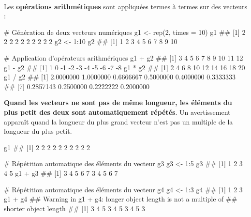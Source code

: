\documentclass[12pt,twosided, notitlepage]{book}
\newenvironment{Shaded}{}{}
\newcommand{\CommentTok}[1]{\textcolor[rgb]{0.00,0.50,0.00}{#1}}
\newcommand{\DataTypeTok}[1]{#1}
\newcommand{\DecValTok}[1]{#1}
\newcommand{\KeywordTok}[1]{\textcolor[rgb]{0.00,0.00,1.00}{#1}}
\newcommand{\NormalTok}[1]{#1}
\newcommand{\OperatorTok}[1]{#1}
\newcommand{\StringTok}[1]{\textcolor[rgb]{0.00,0.50,0.50}{#1}}
\renewenvironment{Shaded}{\begin{snugshade}}{\end{snugshade}}
\begin{document}
~

Les \textbf{opérations arithmétiques} sont appliquées termes à termes
sur des
vecteurs\index{\texttt{+}}\index{\texttt{-}}\index{\texttt{*}}\index{\texttt{/}}
:

\begin{Shaded}
\begin{Highlighting}[]
\CommentTok{# Génération de deux vecteurs numériques}
\NormalTok{g1 <-}\StringTok{ }\KeywordTok{rep}\NormalTok{(}\DecValTok{2}\NormalTok{, }\DataTypeTok{times =} \DecValTok{10}\NormalTok{)}
\NormalTok{g1}
\NormalTok{  ##  [1] 2 2 2 2 2 2 2 2 2 2}
\NormalTok{g2 <-}\StringTok{ }\DecValTok{1}\OperatorTok{:}\DecValTok{10}
\NormalTok{g2}
\NormalTok{  ##  [1]  1  2  3  4  5  6  7  8  9 10}

\CommentTok{# Application d'opérateurs arithmériques}
\NormalTok{g1 }\OperatorTok{+}\StringTok{ }\NormalTok{g2}
\NormalTok{  ##  [1]  3  4  5  6  7  8  9 10 11 12}
\NormalTok{g1 }\OperatorTok{-}\StringTok{ }\NormalTok{g2}
\NormalTok{  ##  [1]  1  0 -1 -2 -3 -4 -5 -6 -7 -8}
\NormalTok{g1 }\OperatorTok{*}\StringTok{ }\NormalTok{g2}
\NormalTok{  ##  [1]  2  4  6  8 10 12 14 16 18 20}
\NormalTok{g1 }\OperatorTok{/}\StringTok{ }\NormalTok{g2}
\NormalTok{  ##  [1] 2.0000000 1.0000000 0.6666667 0.5000000 0.4000000 0.3333333}
\NormalTok{  ##  [7] 0.2857143 0.2500000 0.2222222 0.2000000}
\end{Highlighting}
\end{Shaded}

\textbf{Quand les vecteurs ne sont pas de même longueur, les éléments du
plus petit des deux sont automatiquement répétés}. Un avertissement
apparaît quand la longueur du plus grand vecteur n'est pas un multiple
de la longueur du plus petit.

\begin{Shaded}
\begin{Highlighting}[]
\NormalTok{g1}
\NormalTok{  ##  [1] 2 2 2 2 2 2 2 2 2 2}

\CommentTok{# Répétition automatique des éléments du vecteur g3}
\NormalTok{g3 <-}\StringTok{ }\DecValTok{1}\OperatorTok{:}\DecValTok{5}
\NormalTok{g3}
\NormalTok{  ## [1] 1 2 3 4 5}
\NormalTok{g1 }\OperatorTok{+}\StringTok{ }\NormalTok{g3}
\NormalTok{  ##  [1] 3 4 5 6 7 3 4 5 6 7}

\CommentTok{# Répétition automatique des éléments du vecteur g4}
\NormalTok{g4 <-}\StringTok{ }\DecValTok{1}\OperatorTok{:}\DecValTok{3}
\NormalTok{g4}
\NormalTok{  ## [1] 1 2 3}
\NormalTok{g1 }\OperatorTok{+}\StringTok{ }\NormalTok{g4}
\NormalTok{  ## Warning in g1 + g4: longer object length is not a multiple of}
\NormalTok{  ## shorter object length}
\NormalTok{  ##  [1] 3 4 5 3 4 5 3 4 5 3}
\end{Highlighting}
\end{Shaded}
\end{document}
